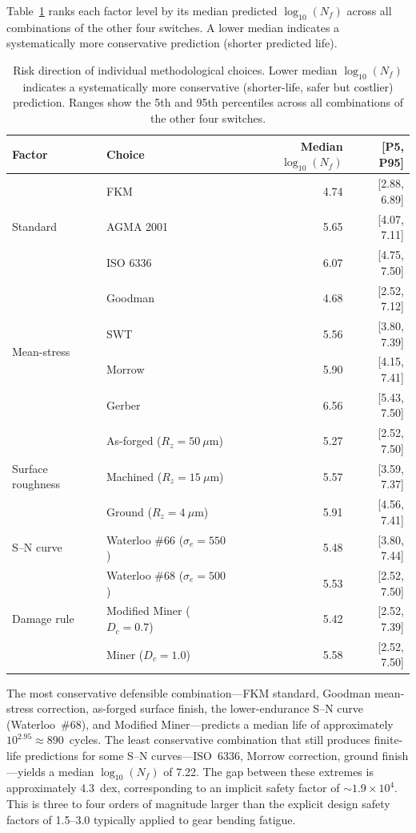 \documentclass[12pt,a4paper]{article}
\begin{document}
Table~\ref{tab:risk} ranks each factor level by its median predicted
$\log_{10}(N_f)$ across all combinations of the other four switches.
A lower median indicates a systematically more conservative prediction
(shorter predicted life).

\begin{table}[h]
\centering
\caption{Risk direction of individual methodological choices. Lower
median $\log_{10}(N_f)$ indicates a systematically more conservative
(shorter-life, safer but costlier) prediction. Ranges show the 5th
and 95th percentiles across all combinations of the other four
switches.\label{tab:risk}}
\begin{tabular}{llrr}
\toprule
Factor & Choice & Median $\log_{10}(N_f)$ & [P5, P95] \\
\midrule
\multirow{3}{*}{Standard}
  & FKM & 4.74 & [2.88, 6.89] \\
  & AGMA 2001 & 5.65 & [4.07, 7.11] \\
  & ISO 6336 & 6.07 & [4.75, 7.50] \\
\midrule
\multirow{4}{*}{Mean-stress}
  & Goodman & 4.68 & [2.52, 7.12] \\
  & SWT & 5.56 & [3.80, 7.39] \\
  & Morrow & 5.90 & [4.15, 7.41] \\
  & Gerber & 6.56 & [5.43, 7.50] \\
\midrule
\multirow{3}{*}{Surface roughness}
  & As-forged ($R_z=50~\mu$m) & 5.27 & [2.52, 7.50] \\
  & Machined ($R_z=15~\mu$m) & 5.57 & [3.59, 7.37] \\
  & Ground ($R_z=4~\mu$m) & 5.91 & [4.56, 7.41] \\
\midrule
S--N curve
  & Waterloo \#66 ($\sigma_e=550$) & 5.48 & [3.80, 7.44] \\
  & Waterloo \#68 ($\sigma_e=500$) & 5.53 & [2.52, 7.50] \\
\midrule
Damage rule
  & Modified Miner ($D_c=0.7$) & 5.42 & [2.52, 7.39] \\
  & Miner ($D_c=1.0$) & 5.58 & [2.52, 7.50] \\
\bottomrule
\end{tabular}
\end{table}

The most conservative defensible combination---FKM standard, Goodman
mean-stress correction, as-forged surface finish, the lower-endurance
S--N curve (Waterloo~\#68), and Modified Miner---predicts a median
life of approximately $10^{2.95} \approx 890$~cycles. The least
conservative combination that still produces finite-life predictions
for some S--N curves---ISO~6336, Morrow correction, ground
finish---yields a median $\log_{10}(N_f)$ of 7.22. The gap between
these extremes is approximately 4.3~dex, corresponding to an implicit
safety factor of $\sim$$1.9 \times 10^4$. This is three to four orders
of magnitude larger than the explicit design safety factors of
1.5--3.0 typically applied to gear bending fatigue.
\end{document}
